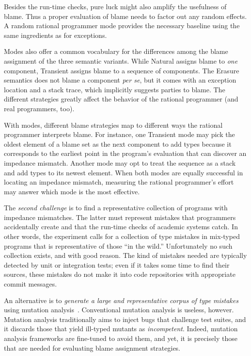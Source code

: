 Besides the run-time checks, pure luck might also amplify the usefulness
of blame. Thus a proper evaluation of blame needs to factor out any random
effects. A random rational programmer mode provides the necessary baseline
using the same ingredients as for exceptions. 


Modes also offer a common vocabulary for the differences among the blame
assignment of the three semantic variants.  While Natural assigns blame to
{\em one\/} component, Transient assigns blame to a sequence of
components. The Erasure semantics does not blame a component {\it per
se\/}, but it comes with an exception location and a stack trace, which
implicitly suggests parties to blame.  The different strategies greatly
affect the behavior of the rational programmer (and real programmers,
too).

With modes, different blame strategies map to different ways the rational
programmer  interprets blame.  For instance, one Transient mode may pick
the oldest element of a blame set as the next component to add types
because it corresponds to the earliest point in the program's evaluation
that can discover an impedance mismatch.  Another mode may opt to treat
the sequence as a stack and add types to its newest element.  When both
modes are equally successful in locating an impedance mismatch, measuring
the rational programmer's effort may answer which mode is the most
effective.



The {\em second challenge\/} is to find a representative collection of
programs with impedance mismatches. The latter must represent mistakes that programmers
accidentally create and that the run-time checks of academic systems catch. In
other words, the experiment calls for a collection of type mistakes in
mix-typed programs that is representative of those ``in the wild.''
Unfortunately no such collection exists, and with good reason. The kind of
mistakes needed are typically detected by unit or integration tests; even if it
takes some time to find their sources, these mistakes do not make it into code
repositories with appropriate commit messages.

An alternative is to {\em generate a large and representative corpus of type
mistakes \/} using mutation analysis~\cite{lipton1971fault, demillo1978hints,
jia2011analysis}. Conventional mutation analysis is useless, however.  Mutation
analysis traditionally aims to inject bugs that challenge test suites, and it
discards those that yield ill-typed mutants as \emph{incompetent}. Indeed,
mutation analysis frameworks are fine-tuned to avoid them, and yet, it is
precisely those that are needed for evaluating blame assignment strategies.

